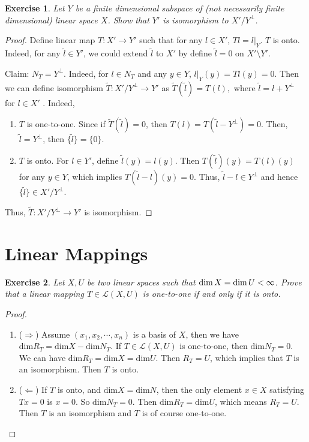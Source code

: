 \documentclass[11pt]{book}
\newtheorem{exercise}{Exercise}[section]
\theoremstyle{definition}
\numberwithin{equation}{chapter}
\begin{document}
\begin{exercise}{\bf *}
Let $Y$ be a finite dimensional subspace of (not necessarily finite dimensional) linear space $X$. Show that $Y'$ is isomorphism to $X'/Y^\bot${\rm \cite{12}}.
\end{exercise}
\begin{proof}
Define linear map $T: X' \to Y'$ such that for any $l \in X'$, $Tl = l|_Y$. $T$ is onto. Indeed, for any $\tilde{l} \in Y'$, we could extend $\tilde{l}$ to $X'$ by define $\tilde{l} = 0$ on $X'\setminus Y'$.

Claim: $N_T = Y^\bot$. Indeed, for $l \in N_T$ and any $y \in Y$, $l|_Y(y) = Tl(y) = 0$. Then we can define isomorphism $\widetilde{T}: X'/Y^\bot \to Y'$ as $\widetilde{T}(\tilde{l}) = T(l),$ where $\tilde{l} = l + Y^\bot$ for $l \in X'$ \cite{14}. Indeed, 
\begin{enumerate}[label=(\alph*)]
    \item $T$ is one-to-one. Since if $\widetilde{T}(\tilde{l}) = 0$, then $T(l) = T\left(\tilde{l} - Y^\bot\right) = 0$. Then, $\tilde{l} = Y^\bot$, then $\{\tilde{l}\} = \{0\}$.
    
    \item $T$ is onto. For $l \in Y'$, define $\tilde{l}(y) = l(y)$. Then $T(\tilde{l})(y) = T(l)(y)$ for any $y \in Y$, which implies $T(\tilde{l} - l)(y) = 0$. Thus, $\tilde{l} - l \in Y^\bot$ and hence $\{\tilde{l}\} \in X'/Y^\bot$.
\end{enumerate}
Thus, $\widetilde{T}: X'/Y^\bot \to Y'$ is isomorphism.
\end{proof}

\medskip

\section{Linear Mappings}
\begin{exercise}
Let $X,U$ be two linear spaces such that ${\rm dim}\, X = {\rm dim}\, U < \infty$. Prove that a linear mapping $T\in\mathscr{L}(X,U)$ is one-to-one if and only if it is onto.
\end{exercise}
\begin{proof}
~\begin{enumerate}[label=(\arabic*)]
    \item ($\Rightarrow$) Assume $(x_1, x_2, \cdots, x_n)$ is a basis of $X$, then we have
    $\text{dim} R_T = \text{dim} X - \text{dim} N_T$. If $T\in \mathscr{L}(X,U)$ is one-to-one, then $\text{dim} N_T = 0$. We can have 
    $\text{dim} R_T = \text{dim} X = \text{dim} U$. Then $R_T = U$, which implies that $T$ is an isomorphism. Then $T$ is onto.
    \item ($\Leftarrow$) If $T$ is onto, and $\text{dim} X = \text{dim} N$, then the only element $x\in X$ satisfying $Tx = 0$ is $x = 0$. So $\text{dim} N_T = 0$. Then $\text{dim} R_T = \text{dim} U$, which means $R_T = U$. Then $T$ is an isomorphism and $T$ is of course one-to-one.
\end{enumerate}
\end{proof}
\end{document}

